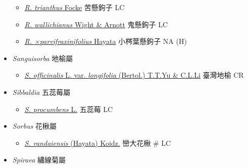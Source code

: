 \begin{itemize}
\begin{itemize}
        \item[] \href{http://www.theplantlist.org/tpl1.1/search?q=Rubus+trianthus}{\textit{R. trianthus} Focke}   苦懸鉤子   LC
        \item[] \href{http://www.theplantlist.org/tpl1.1/search?q=Rubus+wallichianus}{\textit{R. wallichianus} Wight \& Arnott}   鬼懸鉤子   LC
        \item[] \href{http://www.theplantlist.org/tpl1.1/search?q=Rubus+×parvifraxinifolius}{\textit{R. ×parvifraxinifolius} Hayata}   小梣葉懸鉤子   NA (H)
  \end{itemize}
 \item[] \textit{Sanguisorba} 地榆屬
                                
  \begin{itemize}
        \item[] \href{http://www.theplantlist.org/tpl1.1/search?q=Sanguisorba+officinalis+var.+longifolia}{\textit{S. officinalis} L. var. \textit{longifolia} (Bertol.) T.T.Yu \& C.L.Li}   臺灣地榆   CR
  \end{itemize}
 \item[] \textit{Sibbaldia} 五蕊莓屬
                                
  \begin{itemize}
        \item[] \href{http://www.theplantlist.org/tpl1.1/search?q=Sibbaldia+procumbens}{\textit{S. procumbens} L.}   五蕊莓   LC
  \end{itemize}
 \item[] \textit{Sorbus} 花楸屬
                                
  \begin{itemize}
        \item[] \href{http://www.theplantlist.org/tpl1.1/search?q=Sorbus+randaiensis}{\textit{S. randaiensis} (Hayata) Koidz.}   巒大花楸  \# LC
  \end{itemize}
 \item[] \textit{Spiraea} 繡線菊屬
                                

\end{itemize}
